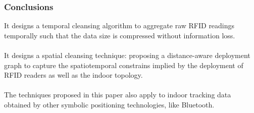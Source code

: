 
\begin{frame}
\frametitle{Conclusions}



It designs a temporal cleansing algorithm to aggregate raw RFID readings temporally such that the data size is compressed without information loss.\\~\\

It designs a spatial cleansing technique: proposing a distance-aware deployment graph to capture the spatiotemporal constrains implied by the deployment of RFID readers as well as the indoor topology.\\~\\

The techniques proposed in this paper also apply to indoor tracking data obtained by other symbolic positioning technologies, like Bluetooth.


\end{frame}
